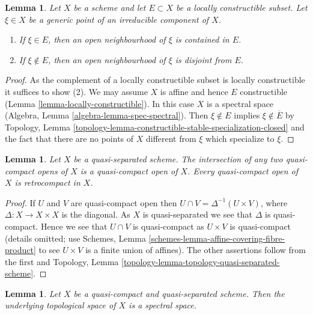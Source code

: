 \documentclass{stacks-project}
\theoremstyle{plain}
\newtheorem{lemma}[subsection]{Lemma}
\theoremstyle{definition}
\theoremstyle{remark}
\numberwithin{equation}{subsection}
\begin{document}
\begin{lemma}
\label{lemma-generic-point-in-constructible}
Let $X$ be a scheme and let $E \subset X$ be a locally constructible subset.
Let $\xi \in X$ be a generic point of an irreducible component of $X$.
\begin{enumerate}
\item If $\xi \in E$, then an open neighbourhood of
$\xi$ is contained in $E$.
\item If $\xi \not \in E$, then an open neighbourhood
of $\xi$ is disjoint from $E$.
\end{enumerate}
\end{lemma}

\begin{proof}
As the complement of a locally constructible subset is locally
constructible it suffices to show (2). We may assume $X$ is
affine and hence $E$ constructible (Lemma \ref{lemma-locally-constructible}).
In this case $X$ is a spectral space
(Algebra, Lemma \ref{algebra-lemma-spec-spectral}).
Then $\xi \not \in E$ implies $\xi \not \in \overline{E}$ by
Topology, Lemma \ref{topology-lemma-constructible-stable-specialization-closed}
and the fact that there are no points of $X$ different from $\xi$
which specialize to $\xi$.
\end{proof}

\begin{lemma}
\label{lemma-quasi-separated-quasi-compact-open-retrocompact}
Let $X$ be a quasi-separated scheme. The intersection of any two
quasi-compact opens of $X$ is a quasi-compact open of $X$.
Every quasi-compact open of $X$ is retrocompact in $X$.
\end{lemma}

\begin{proof}
If $U$ and $V$ are quasi-compact open then
$U \cap V = \Delta^{-1}(U \times V)$, where $\Delta : X \to X \times X$
is the diagonal. As $X$ is quasi-separated we see that $\Delta$ is
quasi-compact. Hence we see that $U \cap V$ is quasi-compact as
$U \times V$ is quasi-compact (details omitted; use
Schemes, Lemma \ref{schemes-lemma-affine-covering-fibre-product}
to see $U \times V$ is a finite union of affines).
The other assertions follow from the first and
Topology, Lemma \ref{topology-lemma-topology-quasi-separated-scheme}.
\end{proof}

\begin{lemma}
\label{lemma-quasi-compact-quasi-separated-spectral}
Let $X$ be a quasi-compact and quasi-separated scheme.
Then the underlying topological space of $X$ is a spectral space.
\end{lemma}
\end{document}
